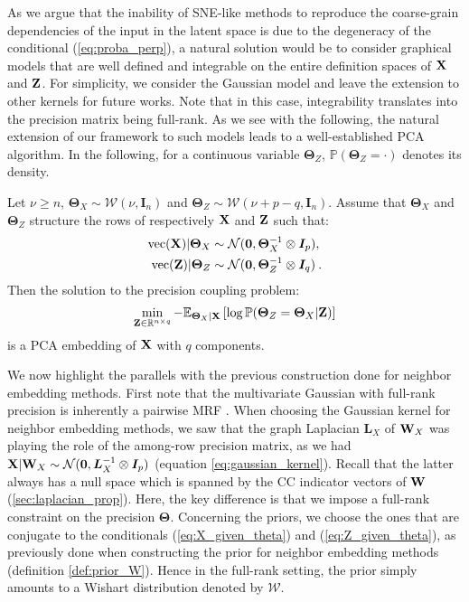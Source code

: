 As we argue that the inability of SNE-like methods to reproduce the coarse-grain dependencies of the input in the latent space is due to the degeneracy of the conditional (\ref{eq:proba_perp}), a natural solution would be to consider graphical models that are well defined and integrable on the entire definition spaces of $\mathbf{X}$ and $\mathbf{Z}$. For simplicity, we consider the Gaussian model and leave the extension to other kernels for future works. Note that in this case, integrability translates into the precision matrix being full-rank. As we see with the following, the natural extension of our framework to such models leads to a well-established PCA algorithm. In the following, for a continuous variable $\bm{\Theta}_{Z}$, $\mathbb{P}(\bm{\Theta}_{Z} = \cdot)$ denotes its density.
\begin{theorem}\label{PCA_graph_coupling}
Let $\nu \geq n$,  $\bm{\Theta}_{X} \sim \mathcal{W}(\nu, \bm{I}_n)$ and $\bm{\Theta}_{Z} \sim \mathcal{W}(\nu + p - q, \bm{I}_n)$. Assume that $\bm{\Theta}_{X}$ and $\bm{\Theta}_{Z}$ structure the rows of respectively $\mathbf{X}$ and $\mathbf{Z}$ such that: 
\begin{align}
    \mathrm{vec}(\mathbf{X}) | \bm{\Theta}_{X} &\sim \mathcal{N}(\bm{0}, \bm{\Theta}_{X}^{-1} \otimes \bm{I}_p), \label{eq:X_given_theta} \\
    \mathrm{vec}(\mathbf{Z}) | \bm{\Theta}_{Z} &\sim \mathcal{N}(\bm{0}, \bm{\Theta}_{Z}^{-1} \otimes \bm{I}_q) \label{eq:Z_given_theta} \:.
\end{align}
Then the solution to the precision coupling problem:
\begin{align*}
    \min_{\mathbf{Z} \in \mathbb{R}^{n \times q}} -\mathbb{E}_{\bm{\Theta}_{X} | \mathbf{X}}\left[\log \mathbb{P}(\bm{\Theta}_{Z}=\bm{\Theta}_{X}|\mathbf{Z})\right]
\end{align*}
is a PCA embedding of $\mathbf{X}$ with $q$ components.
\end{theorem}
We now highlight the parallels with the previous construction done for neighbor embedding methods. First note that the multivariate Gaussian with full-rank precision is inherently a pairwise MRF \citep{rue2005gaussian}. When choosing the Gaussian kernel for neighbor embedding methods, we saw that the graph Laplacian $\bm{L}_{X}$ of $\mathbf{W}_{X}$ was playing the role of the among-row precision matrix, as we had $\mathbf{X} | \mathbf{W}_{X} \sim \mathcal{N}(\bm{0}, \bm{L}_{X}^{-1} \otimes \bm{I}_p)$ (equation \ref{eq:gaussian_kernel}). Recall that the latter always has a null space which is spanned by the CC indicator vectors of $\mathbf{W}$ (\cref{sec:laplacian_prop}). Here, the key difference is that we impose a full-rank constraint on the precision $\bm{\Theta}$. Concerning the priors, we choose the ones that are conjugate to the conditionals (\ref{eq:X_given_theta}) and (\ref{eq:Z_given_theta}), as previously done when constructing the prior for neighbor embedding methods (definition \ref{def:prior_W}). Hence in the full-rank setting, the prior simply amounts to a Wishart distribution denoted by $\mathcal{W}$.

